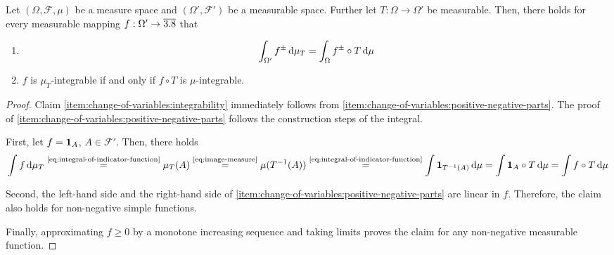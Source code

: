 \begin{theorem}
\label{thm:change-of-variables}
Let $(\Omega,\mathcal{F},\mu)$ be a measure space and $(\Omega',\mathcal{F}')$ be a measurable space.
Further let $T : \Omega \to \Omega'$ be measurable.
Then, there holds for every measurable mapping $f : \Omega' \to \overline{3.8}$ that
\begin{enumerate}[label=(\roman*)]
\item \label{item:change-of-variables:positive-negative-parts}
\begin{equation}\label{eq:change-of-variables}
\int_{\Omega'} f^{\pm}\,\mathrm{d}\mu_T
=
\int_{\Omega} f^{\pm} \circ T\,\mathrm{d}\mu
\end{equation}
\item \label{item:change-of-variables:integrability}
$f$ is $\mu_T$-integrable if and only if $f \circ T$ is $\mu$-integrable.
\qedhere
\end{enumerate}
\end{theorem}
\begin{proof}
Claim \ref{item:change-of-variables:integrability} immediately follows from \ref{item:change-of-variables:positive-negative-parts}.
The proof of \ref{item:change-of-variables:positive-negative-parts} follows the construction steps of the integral.

First, let $f = \mathbf{1}_A$, $A \in \mathcal{F}'$.
Then, there holds
\[
\int f\,\mathrm{d}\mu_T
\overset{\text{\eqref{eq:integral-of-indicator-function}}}{=}
\mu_T(A)
\overset{\text{\eqref{eq:image-measure}}}{=}
\mu(T^{-1}(A))
\overset{\text{\eqref{eq:integral-of-indicator-function}}}{=}
\int \mathbf{1}_{T^{-1}(A)}\,\mathrm{d}\mu
=
\int \mathbf{1}_A \circ T\,\mathrm{d}\mu
=
\int f \circ T\,\mathrm{d}\mu
\]

Second, the left-hand side and the right-hand side of \ref{item:change-of-variables:positive-negative-parts} are linear in $f$.
Therefore, the claim also holds for non-negative simple functions.

Finally, approximating $f \geq 0$ by a monotone increasing sequence and taking limits proves the claim for any non-negative measurable function.
\end{proof}

